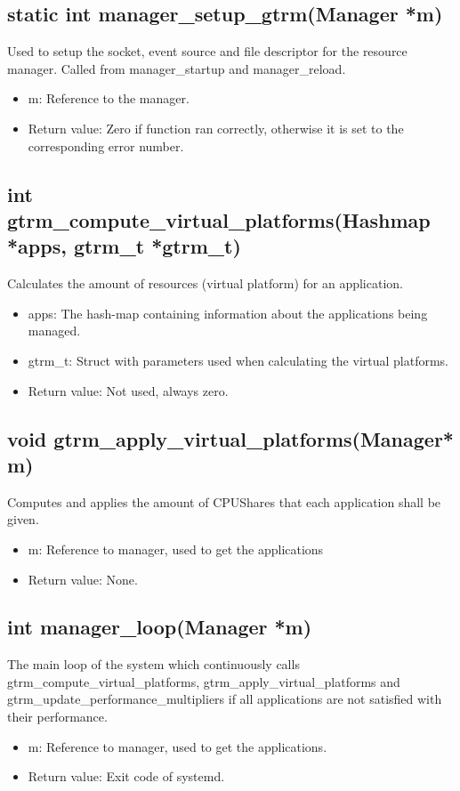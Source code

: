 \documentclass[nobiblatex]{LTHthesis}
\begin{document}
\subsection{static int manager\_setup\_gtrm(Manager *m)}
Used to setup the socket, event source and file descriptor for the resource manager. Called from manager\_startup and manager\_reload.
\begin{itemize}
\item m: Reference to the manager.
\item Return value: Zero if function ran correctly, otherwise it is set to the corresponding error number.
\end{itemize}

\subsection{int gtrm\_compute\_virtual\_platforms(Hashmap *apps, gtrm\_t *gtrm\_t)}
Calculates the amount of resources (virtual platform) for an application.
\begin{itemize}
\item apps: The hash-map containing information about the applications being managed.
\item gtrm\_t: Struct with parameters used when calculating the virtual platforms.
\item Return value: Not used, always zero.
\end{itemize}

\subsection{void gtrm\_apply\_virtual\_platforms(Manager* m)}
Computes and applies the amount of CPUShares that each application shall be given.
\begin{itemize}
\item m: Reference to manager, used to get the applications
\item Return value: None.
\end{itemize}

\subsection{int manager\_loop(Manager *m)}
The main loop of the system which continuously calls gtrm\_compute\_virtual\_platforms, gtrm\_apply\_virtual\_platforms and gtrm\_update\_performance\_multipliers if all applications are not satisfied with their performance.
\begin{itemize}
\item m: Reference to manager, used to get the applications.
\item Return value: Exit code of systemd.
\end{itemize}
\end{document}
